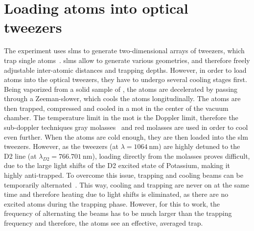 \chapter{Loading atoms into optical tweezers}%
\label{ch:chopping}


The experiment uses \acfp{slm} to generate two-dimensional arrays of tweezers, which trap single atoms~\cite{Osterholz2020}. \acp{slm} allow to generate various geometries, and therefore freely adjustable inter-atomic distances and trapping depths. However, in order to load atoms into the optical tweezers, they have to undergo several cooling stages first. Being vaporized from a solid sample of , the atoms are decelerated by passing through a Zeeman-slower, which cools the atoms longitudinally. The atoms are then trapped, compressed and cooled in a \ac{mot} in the center of the vacuum chamber. The temperature limit in the \ac{mot} is the Doppler limit, therefore the sub-doppler techniques gray molasses~\cite{Salomon2013} and red molasses are used in order to cool even further. When the atoms are cold enough, they are then loaded into the \ac{slm} tweezers. However, as the tweezers (at $\lambda=\SI{1064}{\nano\meter}$) are highly detuned to the D2 line (at $\lambda_{D2} = \SI{766.701}{\nano\meter}$), loading directly from the molasses proves difficult, due to the large light shifts of the D2 excited state of Potassium, making it highly anti-trapped. To overcome this issue, trapping and cooling beams can be temporarily alternated~\cite{Hutzler2017}. This way, cooling and trapping are never on at the same time and therefore heating due to light shifts is eliminated, as there are no excited atoms during the trapping phase. However, for this to work, the frequency of alternating the beams has to be much larger than the trapping frequency and therefore, the atoms see an effective, averaged trap.

